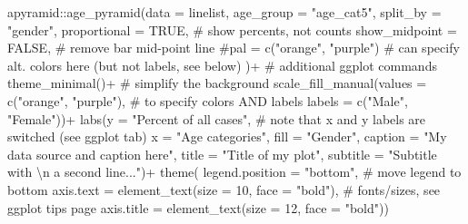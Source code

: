 \documentclass[
]{article}
\newenvironment{Shaded}{\begin{snugshade}}{\end{snugshade}}
\newcommand{\CharTok}[1]{\textcolor[rgb]{0.86,0.64,0.64}{#1}}
\newcommand{\CommentTok}[1]{\textcolor[rgb]{0.50,0.62,0.50}{#1}}
\newcommand{\DataTypeTok}[1]{\textcolor[rgb]{0.87,0.87,0.75}{#1}}
\newcommand{\DecValTok}[1]{\textcolor[rgb]{0.86,0.86,0.80}{#1}}
\newcommand{\KeywordTok}[1]{\textcolor[rgb]{0.94,0.87,0.69}{#1}}
\newcommand{\NormalTok}[1]{\textcolor[rgb]{0.80,0.80,0.80}{#1}}
\newcommand{\OperatorTok}[1]{\textcolor[rgb]{0.94,0.94,0.82}{#1}}
\newcommand{\OtherTok}[1]{\textcolor[rgb]{0.94,0.94,0.56}{#1}}
\newcommand{\StringTok}[1]{\textcolor[rgb]{0.80,0.58,0.58}{#1}}
\begin{document}
\begin{Shaded}
\begin{Highlighting}[]
\NormalTok{apyramid}\OperatorTok{::}\KeywordTok{age\_pyramid}\NormalTok{(}\DataTypeTok{data =}\NormalTok{ linelist,}
                      \DataTypeTok{age\_group =} \StringTok{"age\_cat5"}\NormalTok{,}
                      \DataTypeTok{split\_by =} \StringTok{"gender"}\NormalTok{,}
                      \DataTypeTok{proportional =} \OtherTok{TRUE}\NormalTok{,                  }\CommentTok{\# show percents, not counts}
                      \DataTypeTok{show\_midpoint =} \OtherTok{FALSE}\NormalTok{,                }\CommentTok{\# remove bar mid{-}point line}
                      \CommentTok{\#pal = c("orange", "purple")          \# can specify alt. colors here (but not labels, see below)}
\NormalTok{                      )}\OperatorTok{+}\StringTok{                 }
\StringTok{  }
\StringTok{  }\CommentTok{\# additional ggplot commands}
\StringTok{  }\KeywordTok{theme\_minimal}\NormalTok{()}\OperatorTok{+}\StringTok{                                          }\CommentTok{\# simplify the background}
\StringTok{  }\KeywordTok{scale\_fill\_manual}\NormalTok{(}\DataTypeTok{values =} \KeywordTok{c}\NormalTok{(}\StringTok{"orange"}\NormalTok{, }\StringTok{"purple"}\NormalTok{),         }\CommentTok{\# to specify colors AND labels}
                     \DataTypeTok{labels =} \KeywordTok{c}\NormalTok{(}\StringTok{"Male"}\NormalTok{, }\StringTok{"Female"}\NormalTok{))}\OperatorTok{+}
\StringTok{  }\KeywordTok{labs}\NormalTok{(}\DataTypeTok{y =} \StringTok{"Percent of all cases"}\NormalTok{,                          }\CommentTok{\# note that x and y labels are switched (see ggplot tab)}
       \DataTypeTok{x =} \StringTok{"Age categories"}\NormalTok{,                          }
       \DataTypeTok{fill =} \StringTok{"Gender"}\NormalTok{, }
       \DataTypeTok{caption =} \StringTok{"My data source and caption here"}\NormalTok{,}
       \DataTypeTok{title =} \StringTok{"Title of my plot"}\NormalTok{,}
       \DataTypeTok{subtitle =} \StringTok{"Subtitle with }\CharTok{\textbackslash{}n}\StringTok{ a second line..."}\NormalTok{)}\OperatorTok{+}
\StringTok{  }\KeywordTok{theme}\NormalTok{(}
    \DataTypeTok{legend.position =} \StringTok{"bottom"}\NormalTok{,                             }\CommentTok{\# move legend to bottom}
    \DataTypeTok{axis.text =} \KeywordTok{element\_text}\NormalTok{(}\DataTypeTok{size =} \DecValTok{10}\NormalTok{, }\DataTypeTok{face =} \StringTok{"bold"}\NormalTok{),     }\CommentTok{\# fonts/sizes, see ggplot tips page}
    \DataTypeTok{axis.title =} \KeywordTok{element\_text}\NormalTok{(}\DataTypeTok{size =} \DecValTok{12}\NormalTok{, }\DataTypeTok{face =} \StringTok{"bold"}\NormalTok{))}
\end{Highlighting}
\end{Shaded}
\end{document}
